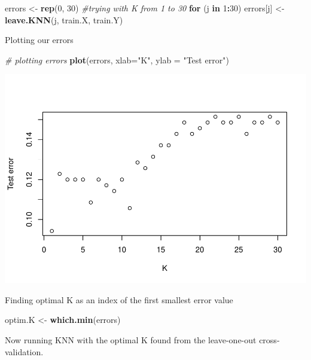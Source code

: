\documentclass[
]{article}
\newenvironment{Shaded}{\begin{snugshade}}{\end{snugshade}}
\newcommand{\CommentTok}[1]{\textcolor[rgb]{0.56,0.35,0.01}{\textit{#1}}}
\newcommand{\ControlFlowTok}[1]{\textcolor[rgb]{0.13,0.29,0.53}{\textbf{#1}}}
\newcommand{\DataTypeTok}[1]{\textcolor[rgb]{0.13,0.29,0.53}{#1}}
\newcommand{\DecValTok}[1]{\textcolor[rgb]{0.00,0.00,0.81}{#1}}
\newcommand{\KeywordTok}[1]{\textcolor[rgb]{0.13,0.29,0.53}{\textbf{#1}}}
\newcommand{\NormalTok}[1]{#1}
\newcommand{\OperatorTok}[1]{\textcolor[rgb]{0.81,0.36,0.00}{\textbf{#1}}}
\newcommand{\StringTok}[1]{\textcolor[rgb]{0.31,0.60,0.02}{#1}}
\begin{document}
\begin{Shaded}
\begin{Highlighting}[]
\NormalTok{errors <-}\StringTok{ }\KeywordTok{rep}\NormalTok{(}\DecValTok{0}\NormalTok{, }\DecValTok{30}\NormalTok{) }\CommentTok{#trying with K from 1 to 30}
\ControlFlowTok{for}\NormalTok{ (j }\ControlFlowTok{in} \DecValTok{1}\OperatorTok{:}\DecValTok{30}\NormalTok{) errors[j] <-}\StringTok{ }\KeywordTok{leave.KNN}\NormalTok{(j, train.X, train.Y)}
\end{Highlighting}
\end{Shaded}

Plotting our errors

\begin{Shaded}
\begin{Highlighting}[]
\CommentTok{# plotting errors}
\KeywordTok{plot}\NormalTok{(errors, }\DataTypeTok{xlab=}\StringTok{"K"}\NormalTok{, }\DataTypeTok{ylab =} \StringTok{"Test error"}\NormalTok{)}
\end{Highlighting}
\end{Shaded}

\includegraphics{Report_files/figure-latex/unnamed-chunk-14-1.pdf}

Finding optimal K as an index of the first smallest error value

\begin{Shaded}
\begin{Highlighting}[]
\NormalTok{optim.K <-}\StringTok{ }\KeywordTok{which.min}\NormalTok{(errors)}
\end{Highlighting}
\end{Shaded}

Now running KNN with the optimal K found from the leave-one-out
cross-validation.
\end{document}
